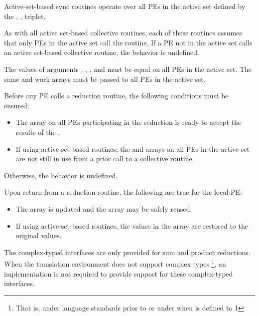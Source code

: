 \begin{apidefinition}
{\begin{DeprecateBlock}
    Active-set-based sync routines operate over all \acp{PE} in the active set
    defined by the , ,  triplet.

    As with all active set-based collective routines,
    each of these routines assumes
    that only \acp{PE} in the active set call the routine.  If a \ac{PE} not in
    the active set calls an active set-based collective routine,
    the behavior is undefined.

    The values of arguments , , ,
    and  must be equal on all \acp{PE} in the active set.
    The same  and  work arrays must be passed to all
    \acp{PE} in the active set.

    Before any \ac{PE} calls a reduction routine, the following conditions must be ensured:
    \begin{itemize}
    \item The \dest{} array on all \acp{PE} participating in the reduction
      is ready to accept the results of the .
    \item If using active-set-based routines, the
       and  arrays on all \acp{PE} in the
      active set are not still in use from a prior call to a collective
      \openshmem routine.
    \end{itemize}
    Otherwise, the behavior is undefined.

    Upon return from a reduction routine, the following are true for the local
    \ac{PE}:
    \begin{itemize}
    \item The \dest{} array is updated and the \source{} array may be safely reused.
    \item If using active-set-based routines,
    the values in the  array are restored to the original values.
    \end{itemize}
\end{DeprecateBlock}

    The complex-typed interfaces are only provided for sum and product reductions.
    When the \Cstd translation environment does not support complex types
    \footnote{That is, under \Cstd language standards prior to \Cstd[99] or under \Cstd[11]
    when  is defined to 1}, an \openshmem
    implementation is not required to provide support for these
    complex-typed interfaces.
}



\end{apidefinition}
